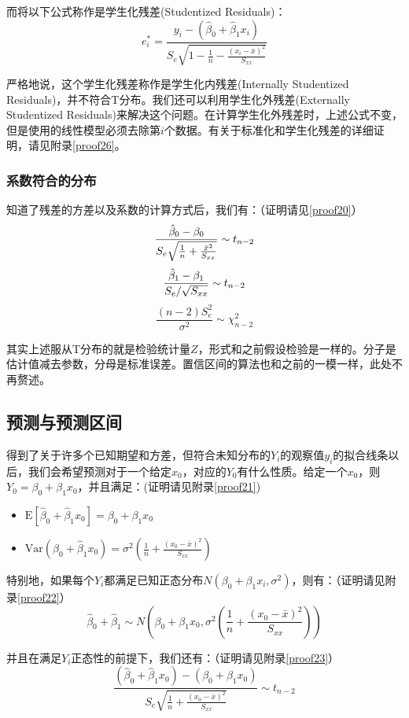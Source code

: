 \documentclass[UTF8]{ctexart}
\begin{document}
而将以下公式称作是学生化残差(Studentized Residuals)：
\[
	e^*_i=\frac{y_i-(\hat\beta_0+\hat\beta_1x_i)}{S_e\sqrt{1-\frac{1}{n}-\frac{(x_i-\bar x)^2}{S_{xx}}}}
\]

严格地说，这个学生化残差称作是学生化内残差(Internally Studentized Residuals)，并不符合T分布。我们还可以利用学生化外残差(Externally Studentized Residuals)来解决这个问题。在计算学生化外残差时，上述公式不变，但是使用的线性模型必须去除第$i$个数据。有关于标准化和学生化残差的详细证明，请见附录\ref{proof26}。

\subsubsection{系数符合的分布}
知道了残差的方差以及系数的计算方式后，我们有：（证明请见\ref{proof20}）
\[
	\frac{\Hat{\beta}_0-\beta_0}{S_e\sqrt{\frac{1}{n}+\frac{\Bar{x}^2}{S_{xx}}}}\sim t_{n-2}
\]
\[
	\frac{\Hat{\beta}_1-\beta_1}{S_e/\sqrt{S_{xx}}}\sim t_{n-2}
\]
\[
	\frac{(n-2)S_e^2}{\sigma^2}\sim \chi_{n-2}^2
\]

其实上述服从T分布的就是检验统计量$Z$，形式和之前假设检验是一样的。分子是估计值减去参数，分母是标准误差。置信区间的算法也和之前的一模一样，此处不再赘述。

\subsection{预测与预测区间}
得到了关于许多个已知期望和方差，但符合未知分布的$Y_i$的观察值$y_i$的拟合线条以后，我们会希望预测对于一个给定$x_0$，对应的$Y_0$有什么性质。给定一个$x_0$，则$Y_0=\beta_0+\beta_1x_0$，并且满足：(证明请见附录\ref{proof21})
\begin{itemize}
	\item $\mathrm{E}[\hat\beta_0+\hat\beta_1x_0]=\beta_0+\beta_1x_0$
	\item $\mathrm{Var}(\hat\beta_0+\hat\beta_1x_0)=\sigma^2\left(\frac{1}{n}+\frac{(x_0-\bar x)^2}{S_{xx}}\right)$
\end{itemize}

特别地，如果每个$Y_i$都满足已知正态分布$N(\beta_0+\beta_1x_i,\sigma^2)$，则有：（证明请见附录\ref{proof22}）
\[
	\hat\beta_0+\hat\beta_1\sim N\left(\beta_0+\beta_1x_0,\sigma^2\left(\frac{1}{n}+\frac{(x_0-\bar x)^2}{S_{xx}}\right)\right)
\]

并且在满足$Y_i$正态性的前提下，我们还有：（证明请见附录\ref{proof23}）
\[
	\frac{(\hat\beta_0+\hat\beta_1x_0)-(\beta_0+\beta_1x_0)}{S_e\sqrt{\frac{1}{n}+\frac{(x_0-\bar x)^2}{S_{xx}}}}\sim t_{n-2}
\]
\end{document}
